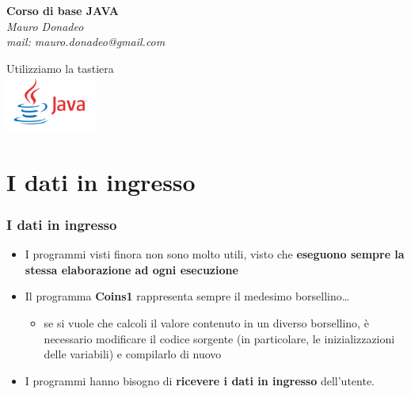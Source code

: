 \begin{frame}
	\begin{block}{}
		\begin{center}
			{\large\textbf{Corso di base JAVA}}\\
			\itshape{Mauro Donadeo}\\
			mail: mauro.donadeo@gmail.com
		\end{center}
	\end{block}
	\begin{block}{}	
		\begin{center}
			\large{Utilizziamo la tastiera}\\
			\includegraphics[width = 30mm]{images/java-logo.jpg}
		\end{center}
	\end{block}	
\end{frame}

\section*{I dati in ingresso}
\begin{frame}
\frametitle{I dati in ingresso}
\begin{itemize}
\item I programmi visti finora non sono molto utili, visto che \textbf{eseguono sempre la stessa elaborazione ad ogni
esecuzione}
\item Il programma \textbf{Coins1} rappresenta sempre il medesimo borsellino\ldots
\begin{itemize}
\item se si vuole che calcoli il valore contenuto in un diverso borsellino, è necessario modificare il codice sorgente 
(in particolare, le inizializzazioni delle variabili) e compilarlo di nuovo
\end{itemize}
\item I programmi hanno bisogno di \textbf{ricevere i dati in ingresso} dell'utente.
\end{itemize}
\end{frame}

